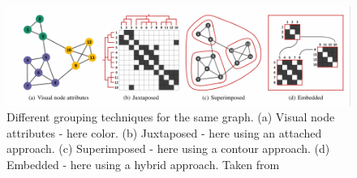 \begin{figure}
    \centering
    \includegraphics[scale=0.5]{media/group_vis.pdf}
    \caption{Different grouping techniques for the same graph. (a) Visual node attributes - here color. (b) Juxtaposed - here using an attached approach. (c) Superimposed - here using a contour approach. (d) Embedded - here using a hybrid approach. Taken from \cite{Vehlow2015}}
    \label{fig:group_vis}
\end{figure}
